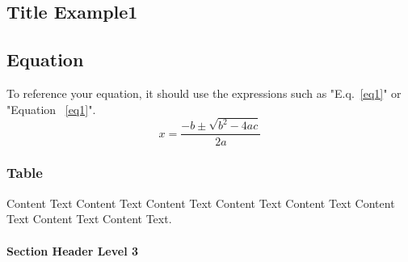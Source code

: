 \begin{Chapter}

\chapter{Title Example1}

\section{Equation}
To reference your equation, it should use the expressions such as "E.q.~\eqref{eq1}" or "Equation ~\eqref{eq1}".
\begin{equation} 
    \mbox{$x = \dfrac{-b\pm\sqrt{b^2-4ac}}{2a}$}
\end{equation}
\label{eq1}

\subsection{Table}

\text Content Text Content Text Content Text Content Text Content Text Content Text Content Text Content Text.

\begin{table*}[htbp]
    \centering
    \caption{Table Example AAA.} \label{tab: complexity1}
\end {table*}

\subsubsection{Section Header Level 3}


\end{Chapter}

